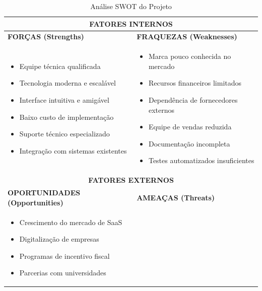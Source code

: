\documentclass[11pt,a4paper]{article}
\begin{document}
\begin{table}[H]
\centering
\caption{Análise SWOT do Projeto}
\label{tab:swot}
\begin{tabular}{|p{7.2cm}|p{7.2cm}|}
\hline
\multicolumn{2}{|c|}{\cellcolor{secondarycolor!20}\textbf{FATORES INTERNOS}} \\
\hline
\textbf{FORÇAS (Strengths)} & \textbf{FRAQUEZAS (Weaknesses)} \\
\hline
\begin{minipage}[t]{7cm}
\begin{itemize}
    \item Equipe técnica qualificada
    \item Tecnologia moderna e escalável
    \item Interface intuitiva e amigável
    \item Baixo custo de implementação
    \item Suporte técnico especializado
    \item Integração com sistemas existentes
\end{itemize}
\end{minipage}
&
\begin{minipage}[t]{7cm}
\begin{itemize}
    \item Marca pouco conhecida no mercado
    \item Recursos financeiros limitados
    \item Dependência de fornecedores externos
    \item Equipe de vendas reduzida
    \item Documentação incompleta
    \item Testes automatizados insuficientes
\end{itemize}
\end{minipage}
\\
\hline
\multicolumn{2}{|c|}{\cellcolor{secondarycolor!20}\textbf{FATORES EXTERNOS}} \\
\hline
\textbf{OPORTUNIDADES (Opportunities)} & \textbf{AMEAÇAS (Threats)} \\
\hline
\begin{minipage}[t]{7cm}
\begin{itemize}
    \item Crescimento do mercado de SaaS
    \item Digitalização de empresas
    \item Programas de incentivo fiscal
    \item Parcerias com universidades

\end{itemize}
\end{minipage}
\end{tabular}
\end{table}
\end{document}
